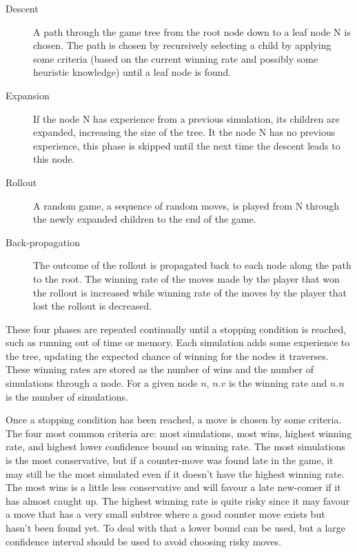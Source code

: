 \begin{description}
\item[Descent] A path through the game tree from the root node down to a leaf node N is chosen. The path is chosen by recursively selecting a child by applying some criteria (based on the current winning rate and possibly some heuristic knowledge) until a leaf node is found.
\item[Expansion] If the node N has experience from a previous simulation, its children are expanded, increasing the size of the tree. It the node N has no previous experience, this phase is skipped until the next time the descent leads to this node.
\item[Rollout] A random game, a sequence of random moves, is played from N through the newly expanded children to the end of the game.
\item[Back-propagation] The outcome of the rollout is propagated back to each node along the path to the root. The winning rate of the moves made by the player that won the rollout is increased while winning rate of the moves by the player that lost the rollout is decreased.
\end{description}

These four phases are repeated continually until a stopping condition is reached, such as running out of time or memory. Each simulation adds some experience to the tree, updating the expected chance of winning for the nodes it traverses. These winning rates are stored as the number of wins and the number of simulations through a node. For a given node $n$, $n.v$ is the winning rate and $n.n$ is the number of simulations.

Once a stopping condition has been reached, a move is chosen by some criteria. The four most common criteria are: most simulations, most wins, highest winning rate, and highest lower confidence bound on winning rate. The most simulations is the most conservative, but if a counter-move was found late in the game, it may still be the most simulated even if it doesn't have the highest winning rate. The most wins is a little less conservative and will favour a late new-comer if it has almost caught up. The highest winning rate is quite risky since it may favour a move that has a very small subtree where a good counter move exists but hasn't been found yet. To deal with that a lower bound can be used, but a large confidence interval should be used to avoid choosing risky moves.

